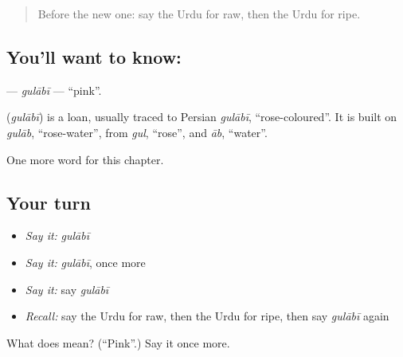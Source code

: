 \label{lesson:UR-C136-gulabi}



\begin{quote}
Before the new one: say the Urdu for raw, then the Urdu for ripe.
\end{quote}

\subsection*{You'll want to know: }
\textbf{} — \emph{gulābī} — \textquotedblleft{}pink\textquotedblright{}.

\begin{cousinweb}
\textbf{} (\emph{gulābī}) is a loan, usually traced to Persian \emph{gulābī}, \textquotedblleft{}rose-coloured\textquotedblright{}. It is built on \emph{gulāb}, \textquotedblleft{}rose-water\textquotedblright{}, from \emph{gul}, \textquotedblleft{}rose\textquotedblright{}, and \emph{āb}, \textquotedblleft{}water\textquotedblright{}.
\end{cousinweb}

\begin{grammarlens}[title={What you've built}]
One more word for this chapter.
\end{grammarlens}

\subsection*{Your turn}
\begin{itemize}
\raggedright
  \item \emph{Say it:} \emph{gulābī}
  \item \emph{Say it:} \emph{gulābī}, once more
  \item \emph{Say it:} say \emph{gulābī}
  \item \emph{Recall:} say the Urdu for raw, then the Urdu for ripe, then say \emph{gulābī} again
\end{itemize}

\begin{tcolorbox}[breakable,colback=teal!4,colframe=teal!35!black,title={Before you move on}]
What does  mean? (\textquotedblleft{}Pink\textquotedblright{}.) Say it once more.
\end{tcolorbox}
